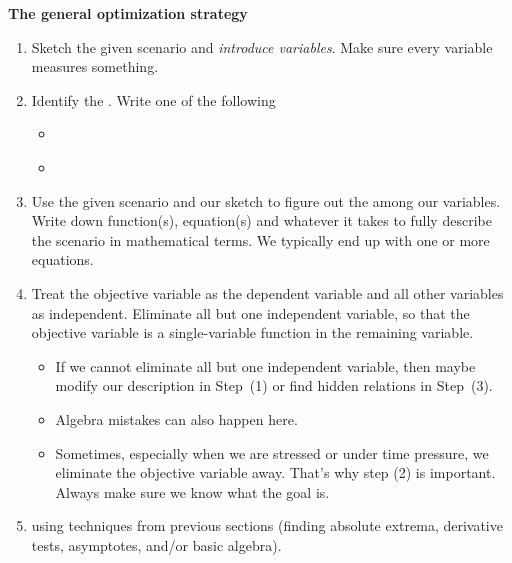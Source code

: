\documentclass[../main.tex]{subfiles}
\begin{document}
  \textbf{The general optimization strategy}
  \label{page:optimization-strategy}
  \begin{enumerate}[label=(\arabic*)]
    \item Sketch the given scenario and \emph{introduce variables}. Make sure every variable measures something.

    \item Identify the . Write one of the following
      \begin{itemize}
        \item \emph{}
        \item \emph{}
      \end{itemize}

    \item Use the given scenario and our sketch to figure out the  among our variables. Write down function(s), equation(s) and whatever it takes to fully describe the scenario in mathematical terms. We typically end up with one or more equations. 

    \item Treat the objective variable as the dependent variable and all other variables as independent. Eliminate all but one independent variable, so that the objective variable is a single-variable function in the remaining variable.

      \begin{itemize}
        \item If we cannot eliminate all but one independent variable, then maybe modify our description in Step~(1) or find hidden relations in Step~(3).
        \item Algebra mistakes can also happen here.
        \item Sometimes, especially when we are stressed or under time pressure, we eliminate the objective variable away. That's why step (2) is important. Always make sure we know what the goal is.
      \end{itemize}

    \item {} using techniques from previous sections (finding absolute extrema, derivative tests, asymptotes, and/or basic algebra).

  \end{enumerate}
  \clearpage
\end{document}
